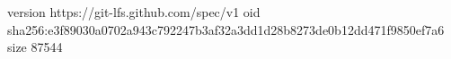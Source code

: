 version https://git-lfs.github.com/spec/v1
oid sha256:e3f89030a0702a943c792247b3af32a3dd1d28b8273de0b12dd471f9850ef7a6
size 87544
